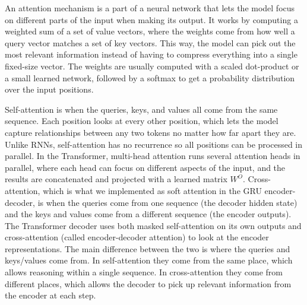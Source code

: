 \documentclass{article}
\begin{document}
An attention mechanism is a part of a neural network that lets the model focus on different parts of the input when making its output. It works by computing a weighted sum of a set of value vectors, where the weights come from how well a query vector matches a set of key vectors. This way, the model can pick out the most relevant information instead of having to compress everything into a single fixed-size vector. The weights are usually computed with a scaled dot-product or a small learned network, followed by a softmax to get a probability distribution over the input positions.

Self-attention is when the queries, keys, and values all come from the same sequence. Each position looks at every other position, which lets the model capture relationships between any two tokens no matter how far apart they are. Unlike RNNs, self-attention has no recurrence so all positions can be processed in parallel. In the Transformer, multi-head attention runs several attention heads in parallel, where each head can focus on different aspects of the input, and the results are concatenated and projected with a learned matrix $W^O$. Cross-attention, which is what we implemented as soft attention in the GRU encoder-decoder, is when the queries come from one sequence (the decoder hidden state) and the keys and values come from a different sequence (the encoder outputs). The Transformer decoder uses both masked self-attention on its own outputs and cross-attention (called encoder-decoder attention) to look at the encoder representations. The main difference between the two is where the queries and keys/values come from. In self-attention they come from the same place, which allows reasoning within a single sequence. In cross-attention they come from different places, which allows the decoder to pick up relevant information from the encoder at each step.
\end{document}

